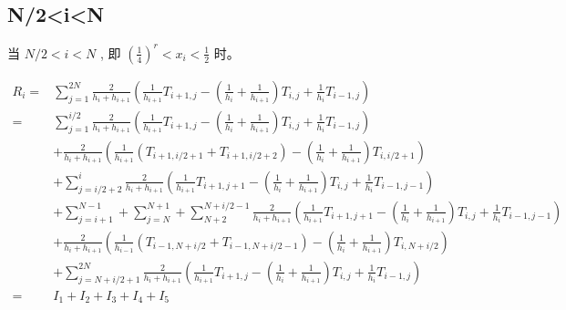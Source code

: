 \documentclass{ctexart}
\begin{document}
\subsection{N/2<i<N}

当 \(N/2<i<N\) , 即 \((\frac{1}{4})^r<x_i<\frac{1}{2}\) 时。


\begin{equation}
    \begin{aligned}
        R_i 
        =& \sum_{j=1}^{2N} \frac{2}{h_i + h_{i+1}} 
        \left( \frac{1}{h_{i+1}} T_{i+1, j} 
        - (\frac{1}{h_{i}}+\frac{1}{h_{i+1}}) T_{i,j}
        +  \frac{1}{h_{i}} T_{i-1, j} \right)   \\
        = & \sum_{j=1}^{i/2} \frac{2}{h_i + h_{i+1}} 
        \left( \frac{1}{h_{i+1}} T_{i+1, j} 
        - (\frac{1}{h_{i}}+\frac{1}{h_{i+1}}) T_{i,j}
        +  \frac{1}{h_{i}} T_{i-1, j} \right)   \\
          & + \frac{2}{h_i + h_{i+1}} 
          \left( \frac{1}{h_{i+1}} (T_{i+1, i/2+1} +  T_{i+1, i/2+2})
          - (\frac{1}{h_{i}}+\frac{1}{h_{i+1}}) T_{i,i/2+1} \right)   \\
          & + \sum_{j=i/2+2}^{i} \frac{2}{h_i + h_{i+1}} 
          \left( \frac{1}{h_{i+1}} T_{i+1, j+1} 
          - (\frac{1}{h_{i}}+\frac{1}{h_{i+1}}) T_{i,j}
          +  \frac{1}{h_{i}} T_{i-1, j-1} \right)   \\
          & + \sum_{j=i+1}^{N-1} + \sum_{j=N}^{N+1} + \sum_{N+2}^{N+i/2-1}\frac{2}{h_i + h_{i+1}} 
          \left( \frac{1}{h_{i+1}} T_{i+1, j+1} 
          - (\frac{1}{h_{i}}+\frac{1}{h_{i+1}}) T_{i,j}
          +  \frac{1}{h_{i}} T_{i-1, j-1} \right)   \\
          & + \frac{2}{h_i + h_{i+1}} 
          \left( \frac{1}{h_{i-1}} (T_{i-1, N+i/2} +  T_{i-1, N+i/2-1})
          - (\frac{1}{h_{i}}+\frac{1}{h_{i+1}}) T_{i,N+i/2} \right)   \\
          & + \sum_{j=N+i/2+1}^{2N} \frac{2}{h_i + h_{i+1}} 
        \left( \frac{1}{h_{i+1}} T_{i+1, j} 
        - (\frac{1}{h_{i}}+\frac{1}{h_{i+1}}) T_{i,j}
        +  \frac{1}{h_{i}} T_{i-1, j} \right)   \\
        = & I_1 + I_2 + I_3 + I_4 + I_5
    \end{aligned}
\end{equation}
\end{document}
